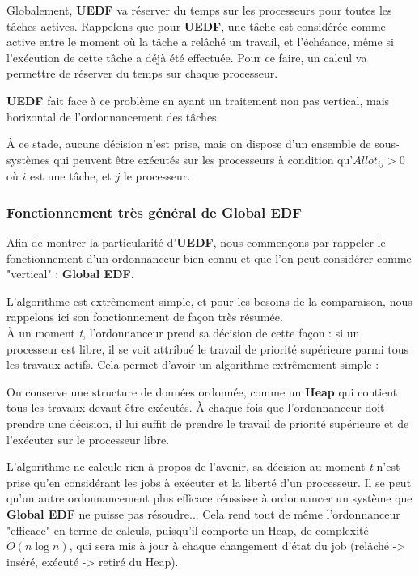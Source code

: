 	Globalement, \textbf{UEDF} va réserver du temps sur les processeurs pour toutes les tâches actives.
	Rappelons que pour \textbf{UEDF}, une tâche est considérée comme active entre le moment où la tâche 
	a relâché un travail, et l'échéance, même si l'exécution de cette tâche a déjà été effectuée.
	Pour ce faire, un calcul va permettre de réserver du temps sur chaque processeur.
	
	\textbf{UEDF} fait face à ce problème en ayant un traitement non pas vertical, mais horizontal
	de l'ordonnancement des tâches.	

	À ce stade, aucune décision n'est prise, mais on dispose d'un ensemble de sous-systèmes qui peuvent 
	être exécutés sur les processeurs à condition qu'$Allot_{ij} > 0$ où $i$ est une tâche, 
	et $j$ le processeur.
	

		\subsubsection{Fonctionnement très général de Global EDF}
		Afin de montrer la particularité d'\textbf{UEDF}, nous commençons par rappeler le fonctionnement 
		d'un ordonnanceur bien connu et que l'on peut considérer comme "vertical" : \textbf{Global EDF}. 
		
		L'algorithme est extrêmement simple, et pour les besoins de la comparaison, nous rappelons 
		ici son fonctionnement de façon très résumée.\\
		À un moment \textit{t}, l'ordonnanceur prend sa décision de cette façon :
		si un processeur est libre, il se voit attribué le travail de priorité supérieure parmi 
		tous les travaux actifs. Cela permet d'avoir un algorithme extrêmement simple :\newline
		
		
		On conserve une structure de données 
		ordonnée, comme un \textbf{Heap}  qui contient tous les travaux
		devant être exécutés. À chaque fois que l'ordonnanceur doit prendre 
		une décision, il lui suffit de prendre le travail de priorité supérieure et 
		de l'exécuter sur le processeur libre.
		
		L'algorithme ne calcule rien à propos de l'avenir, sa décision au moment \textit{t}
		n'est prise qu'en considérant les jobs à exécuter et la liberté d'un 
		processeur. Il se peut qu'un autre ordonnancement plus efficace 
		réussisse à ordonnancer un système que \textbf{Global EDF} ne puisse pas résoudre...
		Cela rend tout de même l'ordonnanceur "efficace" en terme de calculs, 
		puisqu'il comporte un Heap, de complexité $O(n\log n)$, qui sera mis à jour 
		à chaque changement d'état du job (relâché -> inséré, 
		exécuté -> retiré du Heap).
		

